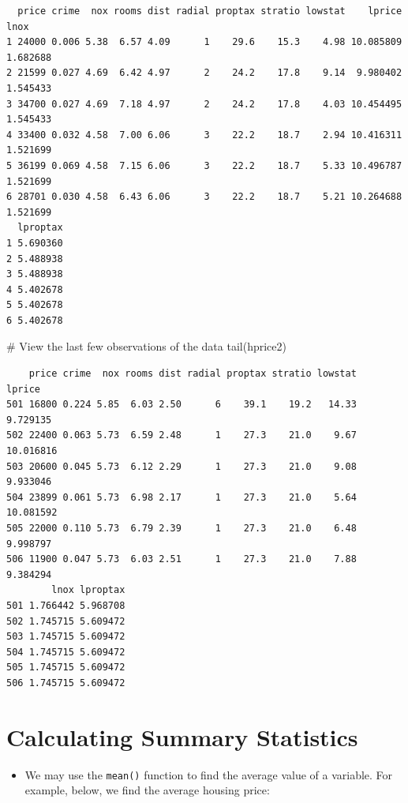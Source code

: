 \documentclass[
  letterpaper,
  DIV=11,
  numbers=noendperiod]{scrreprt}
\newenvironment{Shaded}{\begin{snugshade}}{\end{snugshade}}
\newcommand{\CommentTok}[1]{\textcolor[rgb]{0.37,0.37,0.37}{#1}}
\newcommand{\FunctionTok}[1]{\textcolor[rgb]{0.28,0.35,0.67}{#1}}
\newcommand{\NormalTok}[1]{\textcolor[rgb]{0.00,0.23,0.31}{#1}}
\providecommand{\tightlist}{%
  \setlength{\itemsep}{0pt}\setlength{\parskip}{0pt}}\usepackage{longtable,booktabs,array}
\begin{document}
\begin{verbatim}
  price crime  nox rooms dist radial proptax stratio lowstat    lprice     lnox
1 24000 0.006 5.38  6.57 4.09      1    29.6    15.3    4.98 10.085809 1.682688
2 21599 0.027 4.69  6.42 4.97      2    24.2    17.8    9.14  9.980402 1.545433
3 34700 0.027 4.69  7.18 4.97      2    24.2    17.8    4.03 10.454495 1.545433
4 33400 0.032 4.58  7.00 6.06      3    22.2    18.7    2.94 10.416311 1.521699
5 36199 0.069 4.58  7.15 6.06      3    22.2    18.7    5.33 10.496787 1.521699
6 28701 0.030 4.58  6.43 6.06      3    22.2    18.7    5.21 10.264688 1.521699
  lproptax
1 5.690360
2 5.488938
3 5.488938
4 5.402678
5 5.402678
6 5.402678
\end{verbatim}

\begin{Shaded}
\begin{Highlighting}[]
\CommentTok{\# View the last few observations of the data}
\FunctionTok{tail}\NormalTok{(hprice2)}
\end{Highlighting}
\end{Shaded}

\begin{verbatim}
    price crime  nox rooms dist radial proptax stratio lowstat    lprice
501 16800 0.224 5.85  6.03 2.50      6    39.1    19.2   14.33  9.729135
502 22400 0.063 5.73  6.59 2.48      1    27.3    21.0    9.67 10.016816
503 20600 0.045 5.73  6.12 2.29      1    27.3    21.0    9.08  9.933046
504 23899 0.061 5.73  6.98 2.17      1    27.3    21.0    5.64 10.081592
505 22000 0.110 5.73  6.79 2.39      1    27.3    21.0    6.48  9.998797
506 11900 0.047 5.73  6.03 2.51      1    27.3    21.0    7.88  9.384294
        lnox lproptax
501 1.766442 5.968708
502 1.745715 5.609472
503 1.745715 5.609472
504 1.745715 5.609472
505 1.745715 5.609472
506 1.745715 5.609472
\end{verbatim}

\chapter{Calculating Summary
Statistics}\label{calculating-summary-statistics}

\begin{itemize}
\tightlist
\item
  We may use the \texttt{mean()} function to find the average value of a
  variable. For example, below, we find the average housing price:
\end{itemize}
\end{document}
